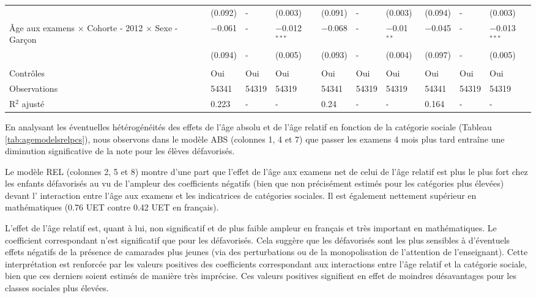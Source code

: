 \documentclass[
]{book}
\begin{document}
\begin{landscape}
\begin{ThreePartTable}
\begin{longtable}[t]{llllllllll}
 & (0.092) & - & (0.003) & (0.091) & - & (0.003) & (0.094) & - & (0.003)\\
Âge aux examens $\times$ Cohorte - 2012 $\times$ Sexe - Garçon & $-$0.061 & - & $-$0.012$^{***}$ & $-$0.068 & - & $-$0.01$^{**}$ & $-$0.045 & - & $-$0.013$^{***}$\\
 & (0.094) & - & (0.005) & (0.093) & - & (0.004) & (0.097) & - & (0.005)\\
 &  &  &  &  &  &  &  &  & \\
Contrôles & Oui & Oui & Oui & Oui & Oui & Oui & Oui & Oui & Oui\\
Observations & 54341 & 54319 & 54319 & 54341 & 54319 & 54319 & 54341 & 54319 & 54319\\
R$^2$ ajusté & 0.223 & - & - & 0.24 & - & - & 0.164 & - & -\\*
\end{longtable}
\end{ThreePartTable}
\endgroup{}
\end{landscape}

\quad En analysant les éventuelles hétérogénéités des effets de l'âge absolu et de l'âge relatif en fonction de la catégorie sociale (Tableau \ref{tab:agemodelsrelpcs}), nous observons dans le modèle ABS (colonnes 1, 4 et 7) que passer les examens 4 mois plus tard entraîne une diminution significative de la note pour les élèves défavorisés.

\quad Le modèle REL (colonnes 2, 5 et 8) montre d'une part que l'effet de l'âge aux examens net de celui de l'âge relatif est plus le plus fort chez les enfants défavorisés au vu de l'ampleur des coefficients négatifs (bien que non précisément estimés pour les catégories plus élevées) devant l' interaction entre l'âge aux examens et les indicatrices de catégories sociales. Il est également nettement supérieur en mathématiques (0.76 UET contre 0.42 UET en français).

\quad L'effet de l'âge relatif est, quant à lui, non significatif et de plus faible ampleur en français et très important en mathématiques. Le coefficient correspondant n'est significatif que pour les défavorisés. Cela suggère que les défavorisés sont les plus sensibles à d'éventuels effets négatifs de la présence de camarades plus jeunes (via des perturbations ou de la monopolisation de l'attention de l'enseignant). Cette interprétation est renforcée par les valeurs positives des coefficients correspondant aux interactions entre l'âge relatif et la catégorie sociale, bien que ces derniers soient estimés de manière très imprécise. Ces valeurs positives signifient en effet de moindres désavantages pour les classes sociales plus élevées.
\end{document}
